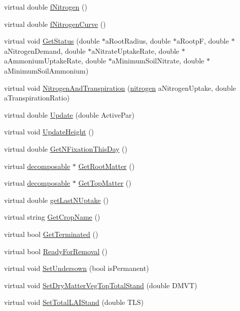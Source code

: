 \begin{DoxyCompactItemize}
\item 
virtual double \hyperlink{classcrop_a602622ac2c0de6432e6b9438dbbb646b}{fNitrogen} ()
\item 
virtual double \hyperlink{classcrop_a3bcfac5c51663141e42b2d6bd17a2cb6}{fNitrogenCurve} ()
\item 
virtual void \hyperlink{classcrop_a7f8e3691756173129745ea074a076442}{GetStatus} (double $\ast$aRootRadius, double $\ast$aRootpF, double $\ast$aNitrogenDemand, double $\ast$aNitrateUptakeRate, double $\ast$aAmmoniumUptakeRate, double $\ast$aMinimumSoilNitrate, double $\ast$aMinimumSoilAmmonium)
\item 
virtual void \hyperlink{classcrop_a4ed6aaf98890015fb52d4d8957313166}{NitrogenAndTranspiration} (\hyperlink{classnitrogen}{nitrogen} aNitrogenUptake, double aTranspirationRatio)
\item 
virtual double \hyperlink{classcrop_a9ed02462e332fffb65498075e7499bf4}{Update} (double ActivePar)
\item 
virtual void \hyperlink{classcrop_aeccf3077c6ad647769145b8064ba426b}{UpdateHeight} ()
\item 
virtual double \hyperlink{classcrop_aec045be7b4c6fd112b48ead6ee68dcd9}{GetNFixationThisDay} ()
\item 
virtual \hyperlink{classdecomposable}{decomposable} $\ast$ \hyperlink{classcrop_ad8b5b9fcd4195ec6ce773c3b454e08b8}{GetRootMatter} ()
\item 
virtual \hyperlink{classdecomposable}{decomposable} $\ast$ \hyperlink{classcrop_aab72365c4fb148684a99ce2bcb9e0d70}{GetTopMatter} ()
\item 
virtual double \hyperlink{classcrop_aca02c95647c1bcb413c8bc53d4702b09}{getLastNUptake} ()
\item 
virtual string \hyperlink{classcrop_a9410b9d5cb1b537736a52d426b682f93}{GetCropName} ()
\item 
virtual bool \hyperlink{classcrop_ae111caaea1504db0b2956e662defdc19}{GetTerminated} ()
\item 
virtual bool \hyperlink{classcrop_a499e790eeeb926cff4529a98458b1419}{ReadyForRemoval} ()
\item 
virtual void \hyperlink{classcrop_ae707acd0c0d6f2b03f3a8f97d1922508}{SetUndersown} (bool isPermanent)
\item 
virtual void \hyperlink{classcrop_aa079c1db3cb10a86a58a3efa0f2e51a9}{SetDryMatterVegTopTotalStand} (double DMVT)
\item 
virtual void \hyperlink{classcrop_ad827f06873022ef9681e99b83d3c9ea1}{SetTotalLAIStand} (double TLS)

\end{DoxyCompactItemize}
